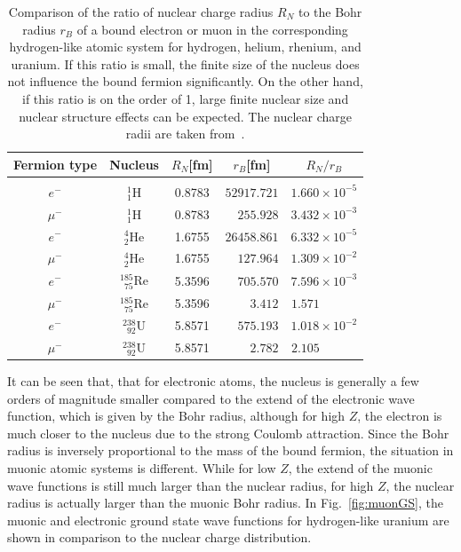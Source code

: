 \begin{table}
\caption{\label{tab:nucl_radii}
Comparison of the ratio of nuclear charge radius $R_N$ to the Bohr radius $r_B$ of a bound electron or muon in the corresponding hydrogen-like atomic system for hydrogen, helium, rhenium, and uranium. If this ratio is small, the finite size of the nucleus does not influence the bound fermion significantly. On the other hand, if this ratio is on the order of 1, large finite nuclear size and nuclear structure effects can be expected. The nuclear charge radii are taken from~\cite{Angeli2013}.}
\centering
\begin{tabular}{ccccc}
Fermion type & Nucleus & $R_N$[fm]&$r_B$[fm]&$R_N/r_B$\\\hline\\[-5pt]
$e^-$&$^1_1$H&0.8783&$52917.721$&$1.660\times 10^{-5}$\\[3pt]
$\mu^-$&$^1_1$H&0.8783&$\phantom{11}255.928$&$3.432\times 10^{-3}$\\[15pt]
$e^-$&$^4_2$He&1.6755&$26458.861$&$6.332\times 10^{-5}$\\[3pt]
$\mu^-$&$^4_2$He&1.6755&$\phantom{11}127.964$&$1.309\times 10^{-2}$\\[15pt]
$e^-$&$^{185}_{\phantom{1}75}$Re&5.3596&$\phantom{11}705.570$&$7.596\times 10^{-3}$\\[3pt]
$\mu^-$&$^{185}_{\phantom{1}75}$Re&5.3596&$\phantom{1111}3.412$&$1.571\phantom{111111}$\\[15pt]
$e^-$&$^{238}_{\phantom{1}92}$U&5.8571&$\phantom{11}575.193$&$1.018\times 10^{-2}$\\[3pt]
$\mu^-$&$^{238}_{\phantom{1}92}$U&5.8571&$\phantom{1111}2.782$&$2.105\phantom{111111}$
\end{tabular}
\end{table}
%
%
It can be seen that, that for electronic atoms, the nucleus is generally a few orders of magnitude smaller compared to the extend of the electronic wave function, which is given by the Bohr radius, although for high $Z$, the electron is much closer to the nucleus due to the strong Coulomb attraction. Since the Bohr radius is inversely proportional to the mass of the bound fermion, the situation in muonic atomic systems is different. While for low $Z$, the extend of the muonic wave functions is still much larger than the nuclear radius, for high $Z$, the nuclear radius is actually larger than the muonic Bohr radius. In Fig.~\ref{fig:muonGS}, the muonic and electronic ground state wave functions for hydrogen-like uranium are shown in comparison to the nuclear charge distribution. 
